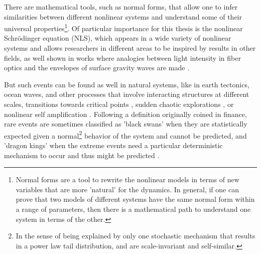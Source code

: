 There are mathematical tools, such as normal forms, that allow one to infer similarities between different nonlinear systems and understand some of their universal properties\footnote{Normal forms \citep{Strogatz2000} are a tool to rewrite the nonlinear models in terms of new variables that are more 'natural' for the dynamics. In general, if one can prove that two models of different systems have the same normal form within a range of parameters, then  there is a mathematical path to understand one system in terms of the other.}. 
Of particular importance for this thesis is the nonlinear Schrödinger equation (NLS), which appears  in a wide variety of nonlinear systems and allows researchers in different areas to be inspired by results in other fields, as well shown in works where analogies between light intensity in fiber optics and the envelopes of surface gravity waves are made \citep{Solli2007}.

But such events can be found  as well in natural systems, like in earth tectonics, ocean waves, and other processes that involve interacting structures at different scales, transitions towards critical points \citep{Sornette2002}, sudden chaotic explorations \citep{Gomel2019}, or nonlinear self amplification \citep{Onorato2021}.
Following a definition originally coined in finance, rare events are sometimes classified as 'black swans' when they are statistically expected given a normal\footnote{In the sense of being explained by only one stochastic mechanism that results in a power law tail distribution, and are scale-invariant and self-similar.} behavior of the system and cannot be predicted, and 'dragon kings' when the extreme events need a particular deterministic mechanism to occur and thus might be predicted \citep{Sornette2009a}.

